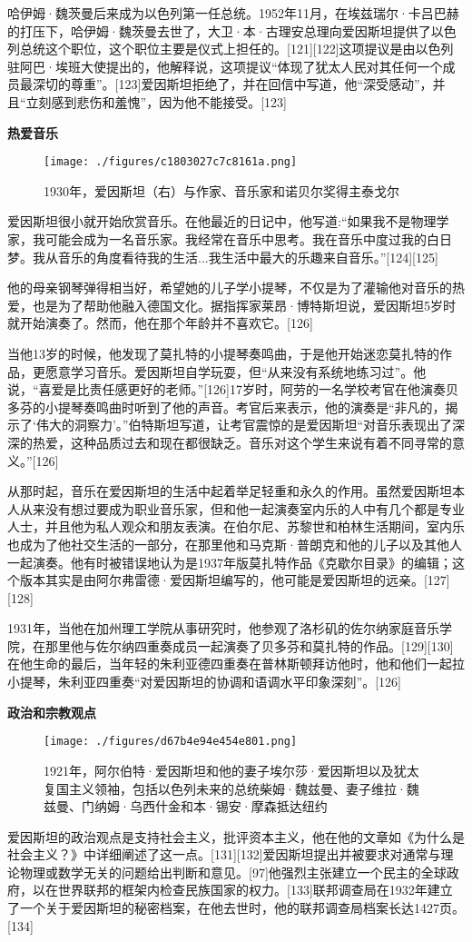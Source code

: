 哈伊姆·魏茨曼后来成为以色列第一任总统。1952年11月，在埃兹瑞尔·卡吕巴赫的打压下，哈伊姆·魏茨曼去世了，大卫·本·古理安总理向爱因斯坦提供了以色列总统这个职位，这个职位主要是仪式上担任的。[121][122]这项提议是由以色列驻阿巴·埃班大使提出的，他解释说，这项提议“体现了犹太人民对其任何一个成员最深切的尊重”。[123]爱因斯坦拒绝了，并在回信中写道，他“深受感动”，并且“立刻感到悲伤和羞愧”，因为他不能接受。[123]

\textbf{热爱音乐}
\begin{figure}[ht]
\centering
\texttt{[image: ./figures/c1803027c7c8161a.png]}
\caption{1930年，爱因斯坦（右）与作家、音乐家和诺贝尔奖得主泰戈尔} \label{fig_AYST_15}
\end{figure}
爱因斯坦很小就开始欣赏音乐。在他最近的日记中，他写道:“如果我不是物理学家，我可能会成为一名音乐家。我经常在音乐中思考。我在音乐中度过我的白日梦。我从音乐的角度看待我的生活...我生活中最大的乐趣来自音乐。”[124][125]

他的母亲钢琴弹得相当好，希望她的儿子学小提琴，不仅是为了灌输他对音乐的热爱，也是为了帮助他融入德国文化。据指挥家莱昂·博特斯坦说，爱因斯坦5岁时就开始演奏了。然而，他在那个年龄并不喜欢它。[126]

当他13岁的时候，他发现了莫扎特的小提琴奏鸣曲，于是他开始迷恋莫扎特的作品，更愿意学习音乐。爱因斯坦自学玩耍，但“从来没有系统地练习过”。他说，“喜爱是比责任感更好的老师。”[126]17岁时，阿劳的一名学校考官在他演奏贝多芬的小提琴奏鸣曲时听到了他的声音。考官后来表示，他的演奏是“非凡的，揭示了‘伟大的洞察力’。”伯特斯坦写道，让考官震惊的是爱因斯坦“对音乐表现出了深深的热爱，这种品质过去和现在都很缺乏。音乐对这个学生来说有着不同寻常的意义。”[126]

从那时起，音乐在爱因斯坦的生活中起着举足轻重和永久的作用。虽然爱因斯坦本人从来没有想过要成为职业音乐家，但和他一起演奏室内乐的人中有几个都是专业人士，并且他为私人观众和朋友表演。在伯尔尼、苏黎世和柏林生活期间，室内乐也成为了他社交生活的一部分，在那里他和马克斯·普朗克和他的儿子以及其他人一起演奏。他有时被错误地认为是1937年版莫扎特作品《克歇尔目录》的编辑；这个版本其实是由阿尔弗雷德·爱因斯坦编写的，他可能是爱因斯坦的远亲。[127][128]

1931年，当他在加州理工学院从事研究时，他参观了洛杉矶的佐尔纳家庭音乐学院，在那里他与佐尔纳四重奏成员一起演奏了贝多芬和莫扎特的作品。[129][130]在他生命的最后，当年轻的朱利亚德四重奏在普林斯顿拜访他时，他和他们一起拉小提琴，朱利亚四重奏“对爱因斯坦的协调和语调水平印象深刻”。[126]

\textbf{政治和宗教观点}
\begin{figure}[ht]
\centering
\texttt{[image: ./figures/d67b4e94e454e801.png]}
\caption{1921年，阿尔伯特·爱因斯坦和他的妻子埃尔莎·爱因斯坦以及犹太复国主义领袖，包括以色列未来的总统柴姆·魏兹曼、妻子维拉·魏兹曼、门纳姆·乌西什金和本·锡安·摩森抵达纽约} \label{fig_AYST_16}
\end{figure}
爱因斯坦的政治观点是支持社会主义，批评资本主义，他在他的文章如《为什么是社会主义？》中详细阐述了这一点。[131][132]爱因斯坦提出并被要求对通常与理论物理或数学无关的问题给出判断和意见。[97]他强烈主张建立一个民主的全球政府，以在世界联邦的框架内检查民族国家的权力。[133]联邦调查局在1932年建立了一个关于爱因斯坦的秘密档案，在他去世时，他的联邦调查局档案长达1427页。[134]

